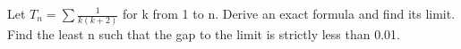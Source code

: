 \documentclass[11pt]{article}
\begin{document}
Let \(T_{n}=\sum  \frac{1}{k(k+2)}\) for k from 1 to n. Derive an exact formula and find its limit. Find the least n such that the gap to the limit is strictly less than 0.01.\par
\vspace{5pt}
\end{document}
